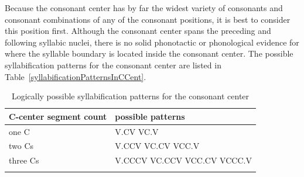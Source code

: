 Because the consonant center has by far the widest variety of consonants and consonant combinations of any of the consonant positions, it is best to consider this position first. 
Although the consonant center spans the preceding and following syllabic nuclei, there is no solid phonotactic or phonological evidence for where the syllable boundary is located inside the consonant center. 
The possible syllabification patterns for the consonant center are listed in Table~\vref{syllabificationPatternsInCCent}. 
\newcommand{\HSP}{\hspace*{4pt}}%
\begin{table}[ht]\centering
\caption{Logically possible syllabification patterns for the consonant center}\label{syllabificationPatternsInCCent}
\begin{tabular}{ll}\mytoprule%
{C-center segment count}	&{possible patterns} \\\hline
one C	& V.CV \HSP VC.V \\%
two Cs	& V.CCV \HSP VC.CV \HSP VCC.V \\
three Cs	& V.CCCV \HSP VC.CCV \HSP VCC.CV \HSP VCCC.V \\\mybottomrule
\end{tabular}
\end{table}

